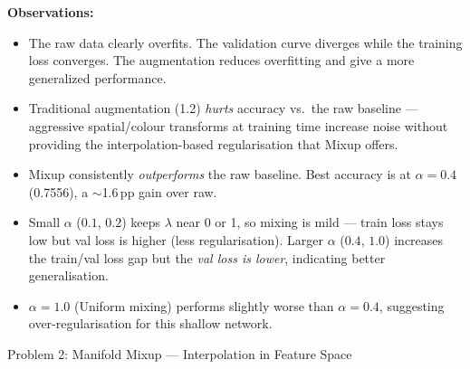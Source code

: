 \documentclass[12pt,a4paper,onecolumn]{exam}
\newcommand{\questionheader}[1]{%
  \begin{tcolorbox}[
    enhanced,
    colback=black,
    coltext=white,
    boxrule=0pt,
    fontupper=\Large\bfseries,
    arc=4mm
  ]
  #1
  \end{tcolorbox}%
}
\begin{document}
\begin{solution}
\noindent\textbf{Observations:}
\begin{itemize}\setlength\itemsep{1pt}
    \item The raw data clearly overfits. The validation curve diverges while the training loss converges. The augmentation reduces overfitting and give a more generalized performance. 
    \item Traditional augmentation (1.2) \emph{hurts} accuracy vs.\ the raw baseline — aggressive spatial/colour transforms at training time increase noise without providing the interpolation-based regularisation that Mixup offers.
    \item Mixup consistently \emph{outperforms} the raw baseline. Best accuracy is at $\alpha=0.4$ (0.7556), a $\sim$1.6\,pp gain over raw.
    \item Small $\alpha$ ($0.1$, $0.2$) keeps $\lambda$ near 0 or 1, so mixing is mild — train loss stays low but val loss is higher (less regularisation). Larger $\alpha$ ($0.4$, $1.0$) increases the train/val loss gap but the \emph{val loss is lower}, indicating better generalisation.
    \item $\alpha=1.0$ (Uniform mixing) performs slightly worse than $\alpha=0.4$, suggesting over-regularisation for this shallow network.
\end{itemize}

\end{solution}


\questionheader{Problem 2: Manifold Mixup — Interpolation in Feature Space}
\end{document}
